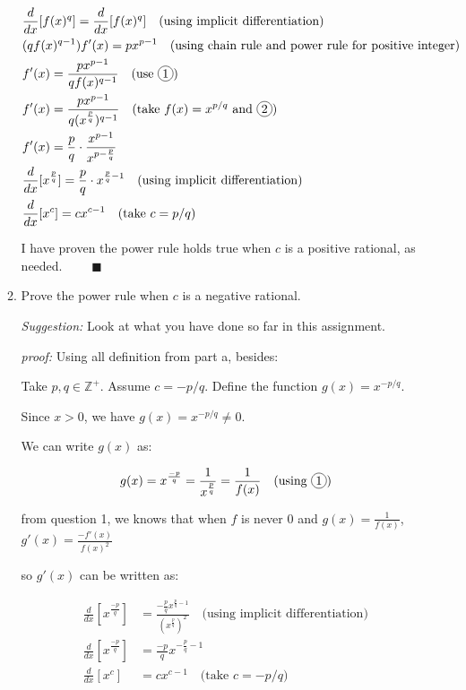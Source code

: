 \documentclass[12pt]{exam}
\newcommand*\circled[1]{\tikz[baseline=(char.base)]{
    \node[shape=circle, draw, inner sep=1pt, 
        minimum height=12pt] (char) {#1};}}
\newcommand {\DS} [1] {${\displaystyle #1}$}
\newcommand{\vv}{\vspace{.4cm}}
\newcommand{\Z}{\mathbb{Z}}
\begin{document}
\begin{enumerate}[resume]
\begin{enumerate}
		\begin{align*}
			& \frac{d}{dx}[f(x)^q] = \frac{d}{dx}[f(x)^q] \quad \mbox{(using implicit differentiation)} \\
			& (qf(x)^{q-1} )f'(x) = px^{p-1}  \quad \mbox{(using chain rule and power rule for positive integer)} \\
			& f'(x) = \frac{px^{p-1}}{qf(x)^{q-1}} \quad \mbox{(use } \circled{1} \mbox{)} \\
			& f'(x) = \frac{px^{p-1}}{q(x^{\frac{p}{q}})^{q-1}} \quad \mbox{(take } f(x)=x^{p/q} \mbox{ and \circled{2})} \\
			& f'(x) = \frac{p}{q} \cdot \frac{x^{p - 1}}{x^{p - \frac{p}{q}}} \\
			& \frac{d}{dx}[x^\frac{p}{q}] = \frac{p}{q} \cdot x^{\frac{p}{q} - 1} \quad \mbox{(using implicit differentiation)} \\
			& \frac{d}{dx}[x^c] = c x^{c-1} \quad \mbox{(take $c=p/q$)}
		\end{align*}

		I have proven the power rule holds true when $c$ is a positive rational, as needed. $\quad \quad \blacksquare$

		\newpage

		\item  Prove the power rule when $c$ is a negative rational.

		\emph{Suggestion:} Look at what you have done so far in this assignment.

		\vv

		\emph{proof:}
		Using all definition from part a, besides:

		Take $p, q \in \Z^+$. Assume $c=-p/q$. Define the function $g(x)=x^{-p/q}$.

		Since $x > 0$, we have $g(x)=x^{-p/q} \neq 0$.

		We can write $g(x)$ as:

		$$
			g(x) = x^{\frac{-p}{q}} = \frac{1}{x^\frac{p}{q}} = \frac{1}{f(x)} \quad \mbox{(using $\circled{1}$)}
		$$

		from question 1, we knows that when $f$ is never $0$ and \DS{g(x) = \frac{1}{f(x)}}, \DS{g'(x) =  \frac{-f'(x)}{f(x)^2}}

		so $g'(x)$ can be written as:

		\begin{align*}
			\frac{d}{dx}[x^\frac{-p}{q}] &= \frac{-\frac{p}{q}x^{\frac{p}{q} - 1}}{(x^{\frac{p}{q}})^2} \quad \mbox{(using implicit differentiation)}\\
			\frac{d}{dx}[x^\frac{-p}{q}] &= \frac{-p}{q}x^{-\frac{p}{q} - 1}\\
			\frac{d}{dx}[x^c] &= c x^{c-1} \quad \mbox{(take $c=-p/q$)}\\
		\end{align*}


\end{enumerate}
\end{enumerate}
\end{document}
